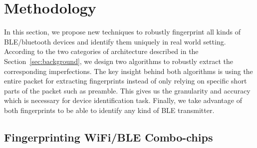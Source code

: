 \section{Methodology}
\label{sec:methodology}


In this section, we propose new techniques to robustly fingerprint all kinds of BLE/bluetooth devices and identify them uniquely in real world setting. According to the two categories of architecture described in the Section~\ref{sec:background}, we design two algorithms to robustly extract the corresponding imperfections. The key insight behind both algorithms is using the entire packet for extracting fingerprints instead of only relying on specific short parts of the packet such as preamble. This gives us the granularity and accuracy which is necessary for device identification task. Finally, we take advantage of both fingerprints to be able to identify any kind of BLE transmitter.

\subsection{Fingerprinting WiFi/BLE Combo-chips}
\label{sec:methodology1}


